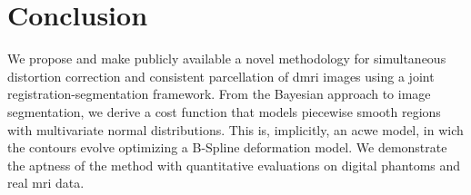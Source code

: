 \section{Conclusion}
\label{sec:conclusion}
%
We propose and make publicly available a novel methodology for
  simultaneous distortion correction and consistent parcellation
  of \gls*{dmri} images using a joint registration-segmentation
  framework.
From the Bayesian approach to image segmentation, we derive
  a cost function that models piecewise smooth regions with
  multivariate normal distributions.
This is, implicitly, an \acrlong*{acwe} model, in wich the
  contours evolve optimizing a B-Spline deformation
  model.
We demonstrate the aptness of the method with quantitative
  evaluations on digital phantoms and real \gls*{mri} data.
